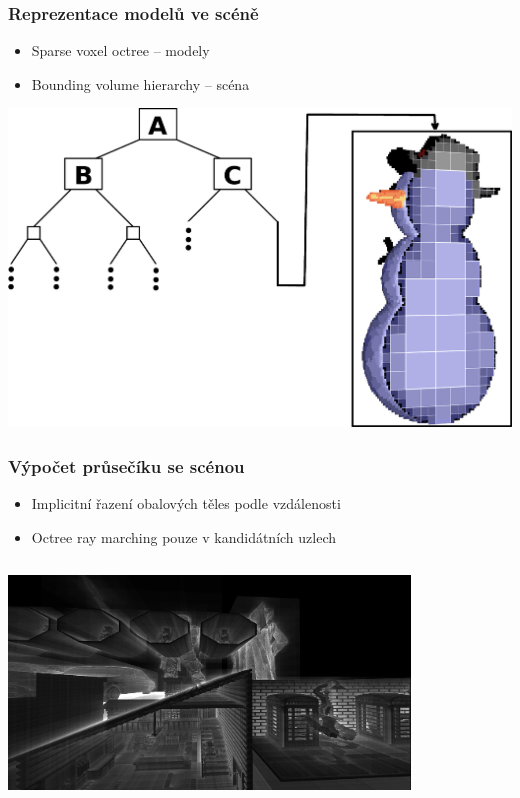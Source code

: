 \documentclass[10pt,xcolor=pdflatex,hyperref={unicode},aspectratio=169]{beamer}
\begin{document}
\begin{frame}\frametitle{Reprezentace modelů ve scéně}
    \begin{itemize}
        \item Sparse voxel octree -- modely
        \item Bounding volume hierarchy -- scéna
    \end{itemize}
    \begin{center}
        \includegraphics[scale=0.8]{img/scene_structure.png}%
    \end{center}
\end{frame}

\begin{frame}\frametitle{Výpočet průsečíku se scénou}
    \begin{itemize}
        \item Implicitní řazení obalových těles podle vzdálenosti
        \item Octree ray marching pouze v kandidátních uzlech
    \end{itemize}
    \begin{column}{\textwidth}
        \begin{center}
            \includegraphics[width=0.8\textwidth]{img/bvh_iter.png}
        \end{center}
    \end{column}
\end{frame}
\end{document}
